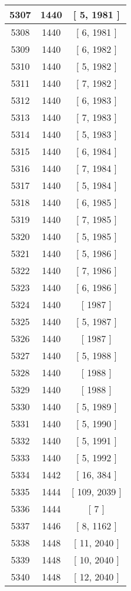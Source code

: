 \begin{center}
\begin{longtable}[H]{|| c c c ||}
\hline
5307 & 1440 & [ 5, 1981 ] \\ 
\hline
5308 & 1440 & [ 6, 1981 ] \\ 
\hline
5309 & 1440 & [ 6, 1982 ] \\ 
\hline
5310 & 1440 & [ 5, 1982 ] \\ 
\hline
5311 & 1440 & [ 7, 1982 ] \\ 
\hline
5312 & 1440 & [ 6, 1983 ] \\ 
\hline
5313 & 1440 & [ 7, 1983 ] \\ 
\hline
5314 & 1440 & [ 5, 1983 ] \\ 
\hline
5315 & 1440 & [ 6, 1984 ] \\ 
\hline
5316 & 1440 & [ 7, 1984 ] \\ 
\hline
5317 & 1440 & [ 5, 1984 ] \\ 
\hline
5318 & 1440 & [ 6, 1985 ] \\ 
\hline
5319 & 1440 & [ 7, 1985 ] \\ 
\hline
5320 & 1440 & [ 5, 1985 ] \\ 
\hline
5321 & 1440 & [ 5, 1986 ] \\ 
\hline
5322 & 1440 & [ 7, 1986 ] \\ 
\hline
5323 & 1440 & [ 6, 1986 ] \\ 
\hline
5324 & 1440 & [ 1987 ] \\ 
\hline
5325 & 1440 & [ 5, 1987 ] \\ 
\hline
5326 & 1440 & [ 1987 ] \\ 
\hline
5327 & 1440 & [ 5, 1988 ] \\ 
\hline
5328 & 1440 & [ 1988 ] \\ 
\hline
5329 & 1440 & [ 1988 ] \\ 
\hline
5330 & 1440 & [ 5, 1989 ] \\ 
\hline
5331 & 1440 & [ 5, 1990 ] \\ 
\hline
5332 & 1440 & [ 5, 1991 ] \\ 
\hline
5333 & 1440 & [ 5, 1992 ] \\ 
\hline
5334 & 1442 & [ 16, 384 ] \\ 
\hline
5335 & 1444 & [ 109, 2039 ] \\ 
\hline
5336 & 1444 & [ 7 ] \\ 
\hline
5337 & 1446 & [ 8, 1162 ] \\ 
\hline
5338 & 1448 & [ 11, 2040 ] \\ 
\hline
5339 & 1448 & [ 10, 2040 ] \\ 
\hline
5340 & 1448 & [ 12, 2040 ] \\ 

\end{longtable}
\end{center}
